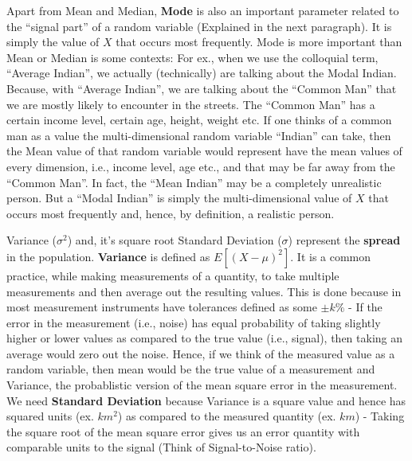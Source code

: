 Apart from Mean and Median, \textbf{Mode} is also an important parameter related to the ``signal part'' of a random variable (Explained in the next paragraph). It is simply the value of $X$ that occurs most frequently. Mode is more important than Mean or Median is some contexts: For ex., when we use the colloquial term, ``Average Indian'', we actually (technically) are talking about the Modal Indian. Because, with ``Average Indian'', we are talking about the ``Common Man'' that we are mostly likely to encounter in the streets. The ``Common Man'' has a certain income level, certain age, height, weight etc. If one thinks of a common man as a value the multi-dimensional random variable ``Indian'' can take, then the Mean value of that random variable would represent have the mean values of every dimension, i.e., income level, age etc., and that may be far away from the ``Common Man''. In fact, the ``Mean Indian'' may be a completely unrealistic person. But a ``Modal Indian'' is simply the multi-dimensional value of $X$ that occurs most frequently and, hence, by definition, a realistic person. 

Variance ($\sigma^2$) and, it's square root Standard Deviation ($\sigma$) represent the \textbf{spread} in the population. \textbf{Variance} is defined as $E[(X-\mu)^2]$. It is a common practice, while making measurements of a quantity, to take multiple measurements and then average out the resulting values. This is done because in most measurement instruments have tolerances defined as some $\pm k\%$ - If the error in the measurement (i.e., noise) has equal probability of taking slightly higher or lower values as compared to the true value (i.e., signal), then taking an average would zero out the noise. Hence, if we think of the measured value as a random variable, then mean would be the true value of a measurement and Variance, the probablistic version of the mean square error in the measurement. We need \textbf{Standard Deviation} because Variance is a square value and hence has squared units (ex. $km^2$) as compared to the measured quantity (ex. $km$) - Taking the square root of the mean square error gives us an error quantity with comparable units to the signal (Think of Signal-to-Noise ratio). 

